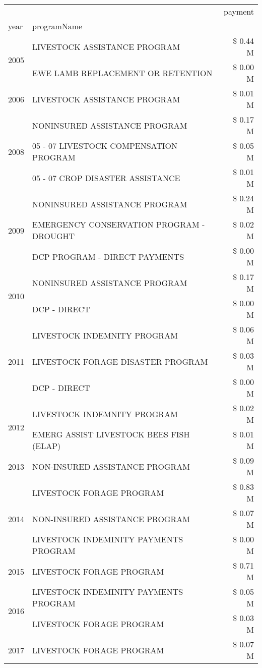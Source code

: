 \begin{tabular}{llr}
\toprule
 &  & payment \\
year & programName &  \\
\midrule
\multirow[t]{2}{*}{2005} & LIVESTOCK ASSISTANCE PROGRAM & \$ 0.44 M \\
 & EWE LAMB REPLACEMENT OR RETENTION & \$ 0.00 M \\
\cline{1-3}
2006 & LIVESTOCK ASSISTANCE PROGRAM & \$ 0.01 M \\
\cline{1-3}
\multirow[t]{3}{*}{2008} & NONINSURED ASSISTANCE PROGRAM & \$ 0.17 M \\
 & 05 - 07 LIVESTOCK COMPENSATION PROGRAM & \$ 0.05 M \\
 & 05 - 07 CROP DISASTER ASSISTANCE & \$ 0.01 M \\
\cline{1-3}
\multirow[t]{3}{*}{2009} & NONINSURED ASSISTANCE PROGRAM & \$ 0.24 M \\
 & EMERGENCY CONSERVATION PROGRAM - DROUGHT & \$ 0.02 M \\
 & DCP PROGRAM - DIRECT PAYMENTS & \$ 0.00 M \\
\cline{1-3}
\multirow[t]{2}{*}{2010} & NONINSURED ASSISTANCE PROGRAM & \$ 0.17 M \\
 & DCP - DIRECT & \$ 0.00 M \\
\cline{1-3}
\multirow[t]{3}{*}{2011} & LIVESTOCK INDEMNITY PROGRAM & \$ 0.06 M \\
 & LIVESTOCK FORAGE DISASTER PROGRAM & \$ 0.03 M \\
 & DCP - DIRECT & \$ 0.00 M \\
\cline{1-3}
\multirow[t]{2}{*}{2012} & LIVESTOCK INDEMNITY PROGRAM & \$ 0.02 M \\
 & EMERG ASSIST LIVESTOCK BEES FISH (ELAP) & \$ 0.01 M \\
\cline{1-3}
2013 & NON-INSURED ASSISTANCE PROGRAM & \$ 0.09 M \\
\cline{1-3}
\multirow[t]{3}{*}{2014} & LIVESTOCK FORAGE PROGRAM & \$ 0.83 M \\
 & NON-INSURED ASSISTANCE PROGRAM & \$ 0.07 M \\
 & LIVESTOCK INDEMINITY PAYMENTS PROGRAM & \$ 0.00 M \\
\cline{1-3}
2015 & LIVESTOCK FORAGE PROGRAM & \$ 0.71 M \\
\cline{1-3}
\multirow[t]{2}{*}{2016} & LIVESTOCK INDEMINITY PAYMENTS PROGRAM & \$ 0.05 M \\
 & LIVESTOCK FORAGE PROGRAM & \$ 0.03 M \\
\cline{1-3}
\multirow[t]{2}{*}{2017} & LIVESTOCK FORAGE PROGRAM & \$ 0.07 M \\

\end{tabular}
